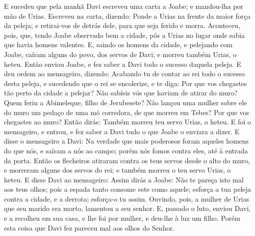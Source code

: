 E sucedeu que pela manhã Davi escreveu uma carta a Joabe; e
mandou-lha por mão de Urias. Escreveu na carta, dizendo:
Ponde a Urias na frente da maior força da peleja; e retirai-vos de
detrás dele, para que seja ferido e morra. Aconteceu, pois,
que, tendo Joabe observado bem a cidade, pôs a Urias no lugar onde
sabia que havia homens valentes. E, saindo os homens da
cidade, e pelejando com Joabe, caíram alguns do povo, dos servos de
Davi; e morreu também Urias, o heteu. Então enviou Joabe, e
fez saber a Davi todo o sucesso daquela peleja. E deu ordem
ao mensageiro, dizendo: Acabando tu de contar ao rei todo o sucesso
desta peleja, e sucedendo que o rei se encolerize, e te diga:
Por que vos chegastes tão perto da cidade a pelejar? Não sabíeis vós
que haviam de atirar do muro? Quem feriu a Abimeleque, filho
de Jerubesete? Não lançou uma mulher sobre ele do muro um pedaço de
uma mó corredora, de que morreu em Tebes? Por que vos chegastes ao
muro? Então dirás: Também morreu teu servo Urias, o heteu. E
foi o mensageiro, e entrou, e fez saber a Davi tudo o que Joabe o
enviara a dizer. E disse o mensageiro a Davi: Na verdade que
mais poderosos foram aqueles homens do que nós, e saíram a nós ao
campo; porém nós fomos contra eles, até à entrada da porta.
Então os flecheiros atiraram contra os teus servos desde o
alto do muro, e morreram alguns dos servos do rei; e também morreu o
teu servo Urias, o heteu. E disse Davi ao mensageiro: Assim
dirás a Joabe: Não te pareça isto mal aos teus olhos; pois a espada
tanto consome este como aquele; esforça a tua peleja contra a
cidade, e a derrota; esforça-o tu assim. Ouvindo, pois, a
mulher de Urias que seu marido era morto, lamentou a seu senhor.
E, passado o luto, enviou Davi, e a recolheu em sua casa, e
lhe foi por mulher, e deu-lhe à luz um filho. Porém esta coisa que
Davi fez pareceu mal aos olhos do Senhor.

\medskip


